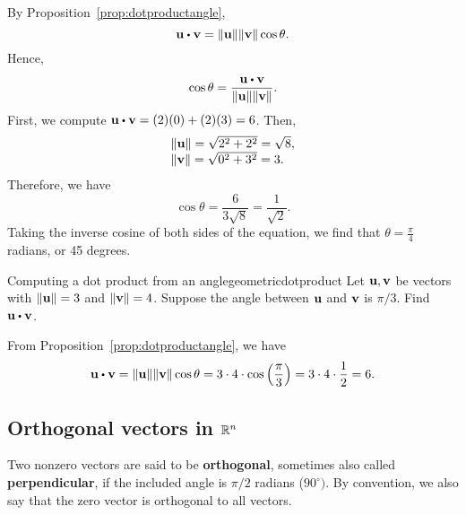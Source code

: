 \begin{solution}
  By Proposition~\ref{prop:dotproductangle},
  \begin{equation*}
    \vect{u}\dotprod \vect{v}=\norm{\vect{u}} \norm{\vect{v}} \cos \theta.
  \end{equation*}
  Hence, 
  \begin{equation*}
    \cos \theta =\frac{\vect{u}\dotprod \vect{v}}{\norm{\vect{u}}\norm{\vect{v}}}.
  \end{equation*}
  First, we compute $\vect{u}\dotprod \vect{v} = (2)(0) + (2)(3) = 6$.
  Then, 
  \begin{equation*}
    \begin{array}{l}
      \|\mbox{\bf u}\| = \sqrt{2^2+2^2}=\sqrt{8},\\
      \|\mbox{\bf v}\| = \sqrt{0^2+3^2}=3.
    \end{array}
  \end{equation*}
  Therefore, we have
  \begin{equation*}
    \cos \theta =\frac{6}{3\sqrt{8}} = \frac{1}{\sqrt{2}}.
  \end{equation*}
  Taking the inverse cosine of both sides of the equation, we find
  that $\theta =\frac{\pi}{4}$ radians, or 45 degrees.
\end{solution}

\begin{example}{Computing a dot product from an angle}{geometricdotproduct}
  Let $\mbox{\bf u},\mbox{\bf v}$ be vectors with $ \|\mbox{\bf u}\| = 3$ and $\|\mbox{\bf v}\| = 4$. 
  Suppose the angle between $\mbox{\bf u}$ and $\mbox{\bf v}$ is $\pi / 3$. Find $\vect{u}\dotprod \vect{v}$.
\end{example}

\begin{solution}
  From Proposition~\ref{prop:dotproductangle}, we have
  \begin{equation*}
    \vect{u}\dotprod \vect{v}
    =\norm{\vect{u}} \norm{\vect{v}} \cos \theta
    =3\cdot 4\cdot \cos\tup{\frac{\pi}{3}}
    =3\cdot 4\cdot \frac{1}{2}=6.
\end{equation*}
\end{solution}

\subsection{Orthogonal vectors in $\mathbb{R}^n$}

Two nonzero vectors are said to be
\textbf{orthogonal}, sometimes also called
\textbf{perpendicular}, if the included
angle is $\pi /2$ radians ($90^{\circ })$. By convention, we also say
that the zero vector is orthogonal to all vectors.

